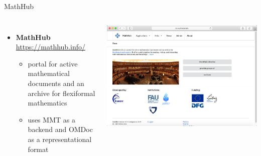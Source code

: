 \documentclass{beamer}
\begin{document}
    \begin{frame}{MathHub}
        \begin{columns}
            \begin{itemize}
                \item \textbf{MathHub} \url{https://mathhub.info/}
                \begin{itemize}
                    \item portal for active mathematical documents and an archive for flexiformal mathematics
                    \item uses MMT as a backend and OMDoc as a representational format
                \end{itemize}
            \end{itemize}
            \includegraphics[scale=0.2]{images/mathhub}
        \end{columns}
    \end{frame}
\end{document}
